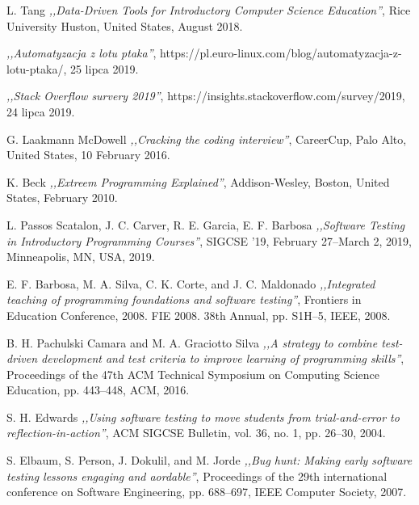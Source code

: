 \begin{thebibliography}{99}
 L. Tang \emph{,,Data-Driven Tools for Introductory Computer Science Education''}, Rice University Huston, United States, August 2018.

 \emph{,,Automatyzacja z lotu ptaka''}, \newline [Online] https://pl.euro-linux.com/blog/automatyzacja-z-lotu-ptaka/, 25 lipca 2019.

 \emph{,,Stack Overflow survery 2019''}, \newline [Online] https://insights.stackoverflow.com/survey/2019, 24 lipca 2019.

 G. Laakmann McDowell \emph{,,Cracking the coding interview''}, CareerCup, Palo Alto, United States, 10 February 2016.

 K. Beck \emph{,,Extreem Programming Explained''}, Addison-Wesley, Boston, United States, February 2010.

 L. Passos Scatalon, J. C. Carver, R. E. Garcia, E. F. Barbosa \emph{,,Software Testing in Introductory Programming Courses''}, SIGCSE '19, February 27–March 2, 2019, Minneapolis, MN, USA, 2019.

 E. F. Barbosa, M. A. Silva, C. K. Corte, and J. C. Maldonado \emph{,,Integrated teaching of programming foundations and software testing''}, Frontiers in Education Conference, 2008. FIE 2008. 38th Annual, pp. S1H–5, IEEE, 2008.

 B. H. Pachulski Camara and M. A. Graciotto Silva \emph{,,A strategy to combine test-driven development and test criteria to improve learning of programming skills''}, Proceedings of the 47th ACM Technical Symposium on Computing Science Education, pp. 443–448, ACM, 2016.

 S. H. Edwards  \emph{,,Using software testing to move students from trial-and-error to reflection-in-action''}, ACM SIGCSE Bulletin, vol. 36, no. 1, pp. 26–30, 2004.

 S. Elbaum, S. Person, J. Dokulil, and M. Jorde \emph{,,Bug hunt: Making early software testing lessons engaging and aordable''}, Proceedings of the 29th international conference on Software Engineering, pp. 688–697, IEEE Computer Society, 2007.


\end{thebibliography}
